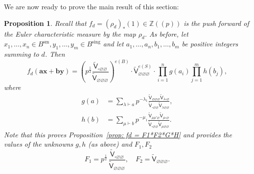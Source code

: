 \documentclass[12pt]{amsart}
\newtheorem{proposition}[theorem]{Proposition}
\theoremstyle{definition}
\newcommand{\ZZ} {\mathbb{Z}}		%
\newcommand{\sfVtilde}{\widetilde{\mathsf{V}}}
\newcommand{\sm}{\operatorname{sm}}
\newcommand{\sing}{\operatorname{sing}}
\newcommand{\boldx}{\boldsymbol{x}}
\newcommand{\boldy}{\boldsymbol{y}}
\newcommand{\bolda}{\boldsymbol{a}}
\newcommand{\boldb}{\boldsymbol{b}}
\renewcommand{\emptyset}{\varnothing}
\newcommand{\half}{\frac{1}{2}}
\newcommand{\bx}{\square}
\begin{document}
We are now ready to prove the main result of this section:

\begin{proposition}\label{prop: formula for fd in terms of the
normalized vertex} Recall that $f_{d}=\left(\rho_{d} \right)_{*}(1)\in
\ZZ (\!(p)\!)$ is the push forward of the Euler characteristic measure by
the map $\rho_{d}$. As before, let $x_{1},\dotsc ,x_{n}\in
B^{\sm},y_{1},\dotsc ,y_{m}\in B^{\sing }$ and let $a_{1},\dotsc
,a_{n},b_{1},\dotsc ,b_{m}$ be positive integers summing to $d$. Then
\[
f_{d}\left(\bolda \boldx +\boldb \boldy  \right)  =
\left(p^{\half}\frac{\sfVtilde_{\bx \emptyset
\emptyset}}{\sfVtilde_{\emptyset \emptyset \emptyset}} \right)^{e(B)}
\cdot \sfVtilde^{e(S)}_{\emptyset \emptyset \emptyset} \cdot
\prod_{i=1}^{n}g(a_{i}) \prod_{j=1}^{m} h(b_{j}),
\]
where
\begin{align*}
g(a)& = \sum_{\lambda \vdash a} p^{-\lambda_{1}}
\frac{\sfVtilde_{\emptyset \emptyset \emptyset} \sfVtilde_{\lambda \bx 
\emptyset}}{\sfVtilde_{\bx \emptyset \emptyset} \sfVtilde_{\lambda
\emptyset \emptyset}},\\
h(b) &= \sum_{\mu \vdash b} p^{-\mu_{1}} \frac{\sfVtilde_{\mu \mu'
\emptyset} \sfVtilde_{ \mu \bx \emptyset}}{\sfVtilde_{\bx \emptyset
\emptyset} \sfVtilde_{\mu \emptyset \emptyset}}.
\end{align*}
Note that this proves Proposition~\ref{prop: fd = F1*F2*G*H} and
provides the values of the unknowns $g,h$ (as above) and
$F_{1},F_{2}$
\[
F_{1} = p^{\half}\,\frac{\sfVtilde_{\bx \emptyset
\emptyset}}{\sfVtilde_{\emptyset \emptyset \emptyset}} , \quad
F_{2} =\sfVtilde_{\emptyset \emptyset \emptyset}. 
\]
\end{proposition}
\end{document}
